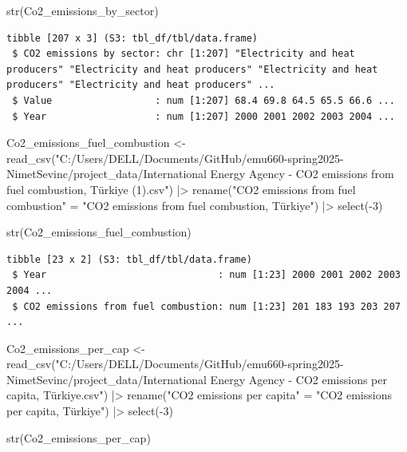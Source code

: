 \documentclass[
  letterpaper,
  DIV=11,
  numbers=noendperiod]{scrartcl}
\newenvironment{Shaded}{\begin{snugshade}}{\end{snugshade}}
\newcommand{\DecValTok}[1]{\textcolor[rgb]{0.68,0.00,0.00}{#1}}
\newcommand{\FunctionTok}[1]{\textcolor[rgb]{0.28,0.35,0.67}{#1}}
\newcommand{\NormalTok}[1]{\textcolor[rgb]{0.00,0.23,0.31}{#1}}
\newcommand{\OtherTok}[1]{\textcolor[rgb]{0.00,0.23,0.31}{#1}}
\newcommand{\SpecialCharTok}[1]{\textcolor[rgb]{0.37,0.37,0.37}{#1}}
\newcommand{\StringTok}[1]{\textcolor[rgb]{0.13,0.47,0.30}{#1}}
\begin{document}
\begin{Shaded}
\begin{Highlighting}[]
\FunctionTok{str}\NormalTok{(Co2\_emissions\_by\_sector)}
\end{Highlighting}
\end{Shaded}

\begin{verbatim}
tibble [207 x 3] (S3: tbl_df/tbl/data.frame)
 $ CO2 emissions by sector: chr [1:207] "Electricity and heat producers" "Electricity and heat producers" "Electricity and heat producers" "Electricity and heat producers" ...
 $ Value                  : num [1:207] 68.4 69.8 64.5 65.5 66.6 ...
 $ Year                   : num [1:207] 2000 2001 2002 2003 2004 ...
\end{verbatim}

\begin{Shaded}
\begin{Highlighting}[]
\NormalTok{Co2\_emissions\_fuel\_combustion }\OtherTok{\textless{}{-}} \FunctionTok{read\_csv}\NormalTok{(}\StringTok{"C:/Users/DELL/Documents/GitHub/emu660{-}spring2025{-}NimetSevinc/project\_data/International Energy Agency {-} CO2 emissions from fuel combustion, Türkiye (1).csv"}\NormalTok{) }\SpecialCharTok{|\textgreater{}} \FunctionTok{rename}\NormalTok{(}\StringTok{"CO2 emissions from fuel combustion"} \OtherTok{=} \StringTok{"CO2 emissions from fuel combustion, Türkiye"}\NormalTok{) }\SpecialCharTok{|\textgreater{}} \FunctionTok{select}\NormalTok{(}\SpecialCharTok{{-}}\DecValTok{3}\NormalTok{)}

\FunctionTok{str}\NormalTok{(Co2\_emissions\_fuel\_combustion)}
\end{Highlighting}
\end{Shaded}

\begin{verbatim}
tibble [23 x 2] (S3: tbl_df/tbl/data.frame)
 $ Year                              : num [1:23] 2000 2001 2002 2003 2004 ...
 $ CO2 emissions from fuel combustion: num [1:23] 201 183 193 203 207 ...
\end{verbatim}

\begin{Shaded}
\begin{Highlighting}[]
\NormalTok{Co2\_emissions\_per\_cap }\OtherTok{\textless{}{-}} \FunctionTok{read\_csv}\NormalTok{(}\StringTok{"C:/Users/DELL/Documents/GitHub/emu660{-}spring2025{-}NimetSevinc/project\_data/International Energy Agency {-} CO2 emissions per capita, Türkiye.csv"}\NormalTok{) }\SpecialCharTok{|\textgreater{}} \FunctionTok{rename}\NormalTok{(}\StringTok{"CO2 emissions per capita"} \OtherTok{=} \StringTok{"CO2 emissions per capita, Türkiye"}\NormalTok{) }\SpecialCharTok{|\textgreater{}} \FunctionTok{select}\NormalTok{(}\SpecialCharTok{{-}}\DecValTok{3}\NormalTok{)}

\FunctionTok{str}\NormalTok{(Co2\_emissions\_per\_cap)}
\end{Highlighting}
\end{Shaded}
\end{document}
